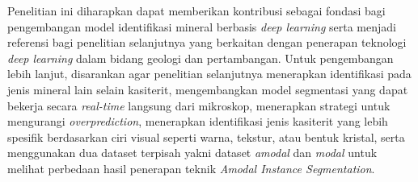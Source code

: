 \begin{center}
	Penelitian ini diharapkan dapat memberikan kontribusi sebagai fondasi bagi pengembangan model identifikasi mineral berbasis \textit{deep learning} serta menjadi referensi bagi penelitian selanjutnya yang berkaitan dengan penerapan teknologi \textit{deep learning} dalam bidang geologi dan pertambangan. Untuk pengembangan lebih lanjut, disarankan agar penelitian selanjutnya menerapkan identifikasi pada jenis mineral lain selain kasiterit, mengembangkan model segmentasi yang dapat bekerja secara \textit{real-time} langsung dari mikroskop, menerapkan strategi untuk mengurangi \textit{overprediction}, menerapkan identifikasi jenis kasiterit yang lebih spesifik berdasarkan ciri visual seperti warna, tekstur, atau bentuk kristal, serta menggunakan dua dataset terpisah yakni dataset \textit{amodal} dan \textit{modal} untuk melihat perbedaan hasil penerapan teknik \textit{Amodal Instance Segmentation}. \par


	\vfill
	
\end{center}
\clearpage